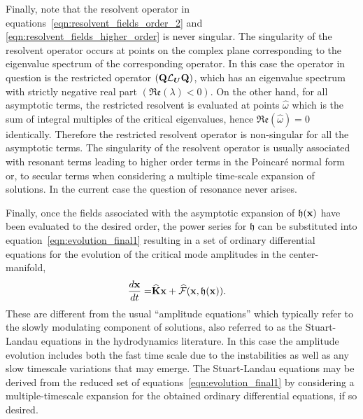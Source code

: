 Finally, note that the resolvent operator in equations~\eqref{eqn:resolvent_fields_order_2} and \eqref{eqn:resolvent_fields_higher_order} is never singular. The singularity of the resolvent operator occurs at points on the complex plane corresponding to the eigenvalue spectrum of the corresponding operator. In this case the operator in question is the restricted operator $(\mathbf{Q}\mathcal{L}_{\boldsymbol{U}}\mathbf{Q})$, which has an eigenvalue spectrum with strictly negative real part $(\mathfrak{Re}(\lambda) < 0)$. On the other hand, for all asymptotic terms, the restricted resolvent is evaluated at points $\widehat{\omega}$ which is the sum of integral multiples of the critical eigenvalues, hence $\mathfrak{Re}(\widehat{\omega}) = 0$ identically. Therefore the restricted resolvent operator is non-singular for all the asymptotic terms. The singularity of the resolvent operator is usually associated with resonant terms leading to higher order terms in the Poincar\'{e} normal form or, to secular terms when considering a multiple time-scale expansion of solutions. In the current case the question of resonance never arises. 

Finally, once the fields associated with the asymptotic expansion of $\mathfrak{h}(\mathbf{x})$ have been evaluated to the desired order, the power series for $\mathfrak{h}$ can be substituted into equation~\eqref{eqn:evolution_final1} resulting in a set of ordinary differential equations for the evolution of the critical mode amplitudes in the center-manifold,
\begin{align}
	\dfrac{d\mathbf{x}}{d t} =& \mathbf{\widehat{K}}\mathbf{x} + \mathcal{\widehat{F}}(\mathbf{x},\mathfrak{h}(\mathbf{x})) \label{eqn:amplitude}.
\end{align}
These are different from the usual ``amplitude equations'' \cite{newell69,cross80,cross09} which typically refer to the slowly modulating component of solutions, also referred to as the Stuart-Landau equations \citep{stuart58,stuart60,sipp07} in the hydrodynamics literature. In this case the amplitude evolution includes both the fast time scale due to the instabilities as well as any slow timescale variations that may emerge. The Stuart-Landau equations may be derived from the reduced set of equations~\eqref{eqn:evolution_final1} by considering a multiple-timescale expansion for the obtained ordinary differential equations, if so desired. 


















